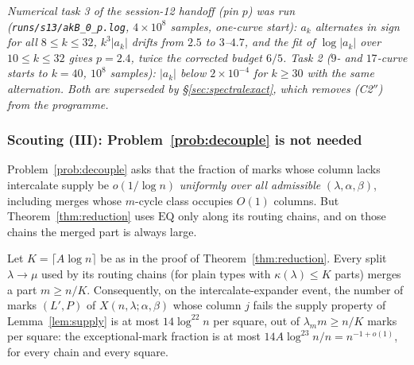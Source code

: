 \emph{Numerical task 3 of the session-12 handoff (pin $p$) was run
(\texttt{runs/s13/akB\_0\_p.log}, $4\times10^8$ samples, one-curve
start): $a_k$ alternates in sign for all $8\le k\le32$, $k^3|a_k|$ drifts
from $2.5$ to $3$--$4.7$, and the fit of $\log|a_k|$ over $10\le k\le32$
gives $p=2.4$, twice the corrected budget $6/5$.  Task 2 ($9$- and
$17$-curve starts to $k=40$, $10^8$ samples): $|a_k|$ below $2\times10^{-4}$
for $k\ge30$ with the same alternation.  Both are superseded by
\S\ref{sec:spectralexact}, which removes (C2$''$) from the programme.}

\subsubsection{Scouting (III): Problem~\ref{prob:decouple} is not needed}
\label{sec:s13decouple}

Problem~\ref{prob:decouple} asks that the fraction of marks whose
column lacks intercalate supply be $o(1/\log n)$ \emph{uniformly over
all admissible} $(\lambda,\alpha,\beta)$, including merges whose
$m$-cycle class occupies $O(1)$ columns.  But
Theorem~\ref{thm:reduction} uses $\mathrm{EQ}$ only along its routing
chains, and on those chains the merged part is always large.

\begin{proposition}
\label{prop:nodecouple}
Let $K=\lceil A\log n\rceil$ be as in the proof of
Theorem~\ref{thm:reduction}.  Every split $\lambda\to\mu$ used by its
routing chains (for plain types with $\kappa(\lambda)\le K$ parts)
merges a part $m\ge n/K$.  Consequently, on the intercalate-expander
event, the number of marks $(L',P)$ of $X(n,\lambda;\alpha,\beta)$
whose column $j$ fails the supply property of Lemma~\ref{lem:supply}
is at most $14\log^{22}n$ per square, out of $\lambda_mm\ge n/K$
marks per square: the exceptional-mark fraction is at most
$14A\log^{23}n/n=n^{-1+o(1)}$, for every chain and every square.
\end{proposition}

